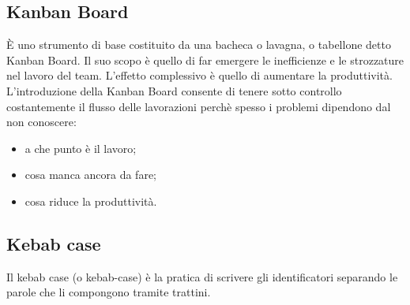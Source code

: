 \documentclass[../glossario.tex]{subfiles}
\begin{document}
\subsection*{Kanban Board}
{}
È uno strumento di base costituito da una bacheca o lavagna, o tabellone detto Kanban Board. Il suo scopo è quello di far emergere le inefficienze e le strozzature nel lavoro del team. L’effetto complessivo è quello di aumentare la produttività. L’introduzione della Kanban Board consente di tenere sotto controllo costantemente il flusso delle lavorazioni perchè spesso i problemi dipendono dal non conoscere:
\begin{itemize}
\item a che punto è il lavoro;
\item cosa manca ancora da fare;
\item cosa riduce la produttività.
\end{itemize}

\subsection*{Kebab case }
{}
Il kebab case (o kebab-case) è la pratica di scrivere gli identificatori separando le parole che li compongono tramite trattini.
\end{document}
